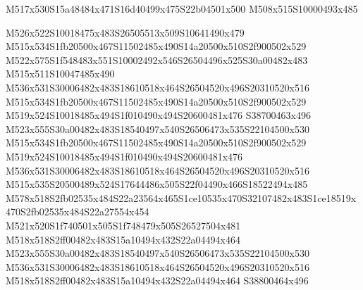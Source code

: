 \documentclass{article}
\begin{document}
\begin{multicols}{2}


\begin{center}
M517x530S15a48484x471S16d40499x475S22b04501x500 M508x515S10000493x485 
\end{center}


M526x522S10018475x483S26505513x509S10641490x479 M515x534S1fb20500x467S11502485x490S14a20500x510S2f900502x529 M522x575S1f548483x551S10002492x546S26504496x525S30a00482x483 M515x511S10047485x490 M536x531S30006482x483S18610518x464S26504520x496S20310520x516 M515x534S1fb20500x467S11502485x490S14a20500x510S2f900502x529 M519x524S10018485x494S1f010490x494S20600481x476 S38700463x496 M523x555S30a00482x483S18540497x540S26506473x535S22104500x530 M515x534S1fb20500x467S11502485x490S14a20500x510S2f900502x529 M519x524S10018485x494S1f010490x494S20600481x476 M536x531S30006482x483S18610518x464S26504520x496S20310520x516 M515x535S20500489x524S17644486x505S22f04490x466S18522494x485 M578x518S2fb02535x484S22a23564x465S1ce10535x470S32107482x483S1ce18519x470S2fb02535x484S22a27554x454 M521x520S1f740501x505S1f748479x505S26527504x481 M518x518S2ff00482x483S15a10494x432S22a04494x464 M523x555S30a00482x483S18540497x540S26506473x535S22104500x530 M536x531S30006482x483S18610518x464S26504520x496S20310520x516 M518x518S2ff00482x483S15a10494x432S22a04494x464 S38800464x496











\end{multicols}
\end{document}
